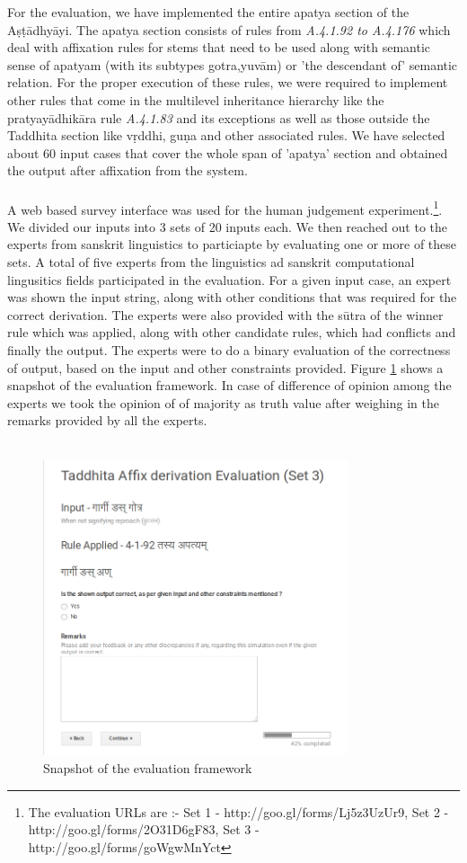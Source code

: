 \documentclass[a4paper,11pt,twoside,openright]{report}
\begin{document}
For the evaluation, we have implemented the entire apatya section of the Aṣṭādhyāyi. The apatya section consists of rules from \textsl{ A.4.1.92 to A.4.176} which deal with affixation rules for stems that need to be used along with semantic sense of apatyam (with its subtypes gotra,yuvām) or 'the descendant of' semantic relation. For the proper execution of these rules, we were required to implement other rules that come in the multilevel inheritance hierarchy like the pratyayādhikāra rule \textsl{ A.4.1.83} and its exceptions as well as those outside the Taddhita section like vṛddhi, guṇa and other associated rules. We have selected about 60 input cases that cover the whole span of 'apatya' section and obtained the output after affixation from the system.  
\\ \\A web based survey interface was used for the human judgement experiment.\footnote{The evaluation URLs are :- Set 1 - http://goo.gl/forms/Lj5z3UzUr9, Set 2 - http://goo.gl/forms/2O31D6gF83, Set 3 - http://goo.gl/forms/goWgwMnYct}. We divided our inputs into 3 sets of 20 inputs each. We then reached out to the experts from sanskrit linguistics to particiapte by evaluating one or more of these sets. A total of five experts from the linguistics ad sanskrit computational lingusitics fields participated in the evaluation. For a given input case, an expert was shown the input string, along with other conditions that was required for the correct derivation. The experts were also provided with the sūtra of the winner rule which was applied, along with other candidate rules, which had conflicts and finally the output. The experts were to do a binary evaluation of the correctness of output, based on the input and other constraints provided. Figure \ref{evalFig} shows a snapshot of the evaluation framework. In case of difference of opinion among the experts we took the opinion of of majority as truth value after weighing in the remarks provided by all the experts.
\\ \\
\begin{figure}[h]
    \centering
	\includegraphics[width=0.8\textwidth]{evalPic}
    \caption{Snapshot of the evaluation framework}
    \label{evalFig}
\end{figure}
\end{document}
